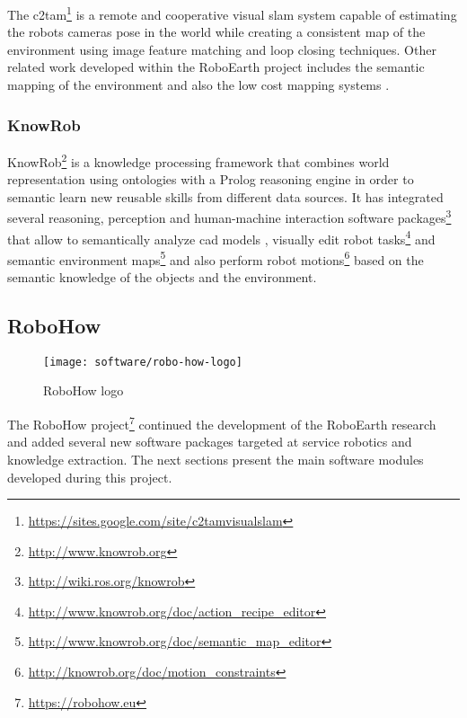 The \gls{c2tam}\footnote{\url{https://sites.google.com/site/c2tamvisualslam}} \cite{Riazuelo2014} is a remote and cooperative visual \gls{slam} system capable of estimating the robots cameras pose in the world while creating a consistent map of the environment using image feature matching and loop closing techniques. Other related work developed within the RoboEarth project includes the semantic mapping of the environment \cite{Riazuelo2015} and also the low cost mapping systems \cite{Mohanarajah2015}.


\subsubsection{KnowRob}

KnowRob\footnote{\url{http://www.knowrob.org}} \cite{tenorth2011PhD,Tenorth2013k} is a knowledge processing framework that combines world representation using ontologies with a Prolog reasoning engine in order to semantic learn new reusable skills from different data sources. It has integrated several reasoning, perception and human-machine interaction software packages\footnote{\url{http://wiki.ros.org/knowrob}} that allow to semantically analyze \gls{cad} models \cite{Lavoue2005,Tenorth2013cad}, visually edit robot tasks\footnote{\url{http://www.knowrob.org/doc/action_recipe_editor}} and semantic environment maps\footnote{\url{http://www.knowrob.org/doc/semantic_map_editor}} \cite{Pangercic2012} and also perform robot motions\footnote{\url{http://knowrob.org/doc/motion_constraints}} \cite{tenorth14motiontemplates} based on the semantic knowledge of the objects and the environment.


\subsection{RoboHow}

\begin{wrapfigure}{r}{0.23\textwidth}
	\centering
	\vspace*{-2em}
	\texttt{[image: software/robo-how-logo]}
	\caption{RoboHow logo}
	\label{fig:robo-how-logo}
\end{wrapfigure}

The RoboHow project\footnote{\url{https://robohow.eu}} continued the development of the RoboEarth research and added several new software packages targeted at service robotics and knowledge extraction. The next sections present the main software modules developed during this project.


